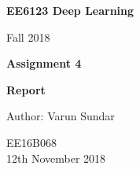 \begin{titlepage}
    \begin{center}
        \vspace*{1cm}
        
        \Huge
          \textbf{EE6123 Deep Learning}
        
        \vspace{0.5cm}
        \LARGE
        Fall 2018
        
        \vspace{1.5cm}
        
        \textbf{Assignment 4}
   		  \vspace{1.5cm}
        
        \textbf{Report}
       
        \vfill
        
        Author: Varun Sundar
        
        \vspace{0.8cm}
          \Large
        EE16B068 \\
        \vspace{0.5cm}
       12th November 2018
        
    \end{center}
\end{titlepage}